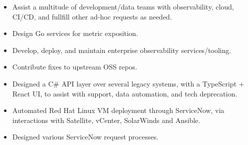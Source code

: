 \documentclass[10pt,a4paper]{altacv}
\begin{document}
\tagline{}

\begin{fullwidth}
\makecvheader
\end{fullwidth}




\begin{itemize}
    \setlength{\itemindent}{0.5em}
    \item   \small{Assist a multitude of development/data teams with observability, cloud, CI/CD, and fullfill other ad-hoc requests as needed.}
    \item   \small{Design Go services for metric exposition.}
    \item   \small{Develop, deploy, and maintain enterprise observability services/tooling.}
    \item   \small{Contribute fixes to upstream OSS repos.}
\end{itemize}

\medskip

\divider



\begin{itemize}
    \setlength{\itemindent}{0.5em}
    \item   \small{Designed a C\# API layer over several legacy systems, with a TypeScript + React UI, to assist with support, data automation, and tech deprecation.}
\end{itemize}

\medskip


\begin{itemize}
    \setlength{\itemindent}{0.5em}
    \item   \small{Automated Red Hat Linux VM deployment through ServiceNow, via interactions with Satellite, vCenter, SolarWinds and Ansible.}
    \item   \small{Designed various ServiceNow request processes.}
\end{itemize}
\end{document}
